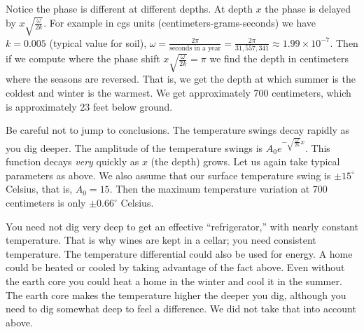 \documentclass{ximera}
\begin{document}
Notice the phase is different at different depths.  At depth $x$ the phase is delayed by $x \sqrt{\frac{\omega}{2k}}$. For example in cgs units (centimeters-grams-seconds) we have $k=0.005$ (typical value for soil), $\omega = \frac{2\pi}{\text{seconds in a year}} = \frac{2\pi}{31,557,341} \approx 1.99 \times {10}^{-7}$.   Then if we compute where the phase shift $x \sqrt{\frac{\omega}{2k}} = \pi$ we find the depth in centimeters where the seasons are reversed.  That is, we get the depth at which summer is the coldest and winter is the warmest. We get approximately 700 centimeters, which is approximately 23 feet below ground.

Be careful not to jump to conclusions.  The temperature swings decay rapidly as you dig deeper.  The amplitude of the temperature swings is $A_0 e^{-\sqrt{\frac{\omega}{2k}} x}$.  This function decays \emph{very} quickly as $x$ (the depth) grows. Let us again take typical parameters as above.  We also assume that our surface temperature swing is $\pm {15}^\circ$ Celsius, that is, $A_0 = 15$.  Then the maximum temperature variation at 700 centimeters is only $\pm {0.66}^\circ$ Celsius.

You need not dig very deep to get an effective ``refrigerator,'' with nearly constant temperature.  That is why wines are kept in a cellar; you need consistent temperature. The temperature differential could also be used for energy.  A home could be heated or cooled by taking advantage of the fact above. Even without the earth core you could heat a home in the winter and cool it in the summer.  The earth core makes the temperature higher the deeper you dig, although you need to dig somewhat deep to feel a difference. We did not take that into account above.
\end{document}
